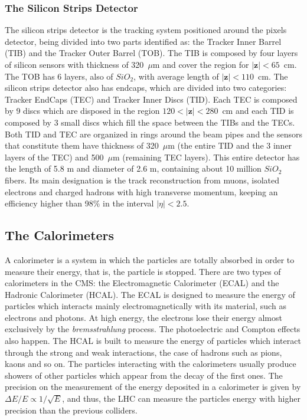 \subsubsection{The Silicon Strips Detector}
The silicon strips detector is the tracking system positioned around the pixels detector, being divided into two parts identified as: the Tracker Inner Barrel (TIB) and the Tracker Outer Barrel (TOB). The TIB is composed by four layers of silicon sensors with thickness of 320~$\mu$m and cover the region for $|\textbf{z}| < 65$~cm. The TOB has 6 layers, also of $SiO_2$, with average length of $|\textbf{z}| < 110$~cm. The silicon strips detector also has endcaps, which are divided into two categories: Tracker EndCaps (TEC) and Tracker Inner Discs (TID). Each TEC is composed by 9 discs which are disposed in the region $120 < |\textbf{z}| < 280$~cm and each TID is composed by 3 small discs which fill the space between the TIBs and the TECs. Both TID and TEC are organized in rings around the beam pipes and the sensors that constitute them have thickness of 320~$\mu$m (the entire TID and the 3 inner layers of the TEC) and 500~$\mu$m (remaining TEC layers). This entire detector has the length of 5.8 m and diameter of 2.6 m, containing about 10 million $SiO_{2}$ fibers. Its main designation is the track reconstruction from muons, isolated electrons and charged hadrons with high transverse momentum, keeping an efficiency higher than 98$\%$ in the interval $|\eta| < 2.5$.

\subsection{The Calorimeters}
A calorimeter is a system in which the particles are totally absorbed in order to measure their energy, that is, the particle is stopped. There are two types of calorimeters in the CMS: the Electromagnetic Calorimeter (ECAL) and the Hadronic Calorimeter (HCAL). The ECAL is designed to measure the energy of particles which interacts mainly electromagnetically with its material, such as electrons and photons. At high energy, the electrons lose their energy almost exclusively by the \textit{bremsstrahlung} process. The photoelectric and Compton effects also happen. The HCAL is built to measure the energy of particles which interact through the strong and weak interactions, the case of hadrons such as pions, kaons and so on. The particles interacting with the calorimeters usually produce showers of other particles which appear from the decay of the first ones. The precision on the measurement of the energy deposited in a calorimeter is given by $\Delta E/E \propto 1/ \sqrt{E}$, and thus, the LHC can measure the particles energy with higher precision than the previous colliders.

